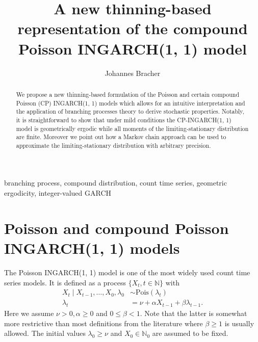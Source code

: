 \documentclass[review]{elsarticle}
\begin{document}
\title{A new thinning-based representation of the compound Poisson INGARCH(1, 1) model}
\author{Johannes Bracher}
\address{Chair of Statistics and Econometrics, Karlsruhe Institute of Technology, \\ %
Computational Statistics Group, Heidelberg Institute for Theoretical Studies}


\newcommand{\juv}{S}



\begin{abstract}
We propose a new thinning-based formulation of the Poisson and certain compound Poisson (CP) INGARCH(1, 1) models which allows for an intuitive interpretation and the application of branching processes theory to derive stochastic properties. Notably, it is straightforward to show that under mild conditions the CP-INGARCH(1, 1) model is geometrically ergodic while all moments of the limiting-stationary distribution are finite. Moreover we point out how a Markov chain approach can be used to approximate the limiting-stationary distribution with arbitrary precision.
\end{abstract}

\begin{keyword}
branching process, compound distribution, count time series, geometric ergodicity, integer-valued GARCH
\end{keyword}

\maketitle


\section{Poisson and compound Poisson INGARCH(1, 1) models}
\label{sec:original_formulation}

The Poisson INGARCH(1, 1) model \cite{Ferland2006, Fokianos2009} is one of the most widely used count time series models. It is defined as a process $\{X_t, t \in \mathbb{N}\}$ with
\begin{align}
X_t \mid X_{t - 1}, \dots, X_0, \lambda_0 & \sim \text{Pois}(\lambda_t)\label{eq:X_t_original}\\
\lambda_t & = \nu + \alpha X_{t - 1} + \beta \lambda_{t - 1}. \label{eq:lambda_t}
\end{align}
Here we assume $\nu > 0, \alpha \geq 0$ and $0 \leq \beta < 1$. Note that the latter is somewhat more restrictive than most definitions from the literature where $\beta \geq 1$ is usually allowed. The initial values $\lambda_0 \geq \nu$ and $X_0 \in \mathbb{N}_0$ are assumed to be fixed.
\end{document}
